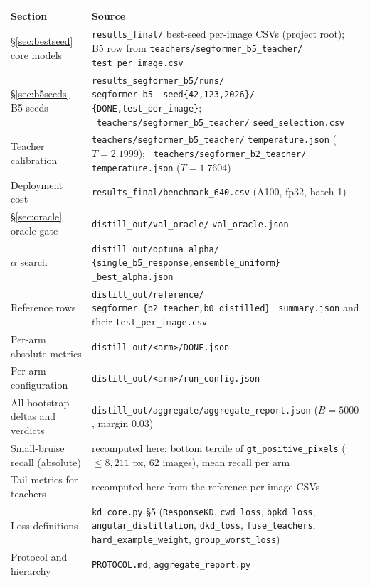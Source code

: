 \documentclass[11pt]{article}
\begin{document}
\begin{center}\footnotesize
\setlength{\tabcolsep}{4pt}
\begin{tabular}{>{\raggedright\arraybackslash}p{3.9cm} >{\raggedright\arraybackslash}p{10.6cm}}
\toprule
\textbf{Section} & \textbf{Source} \\
\midrule
\S\ref{sec:bestseed} core models &
\texttt{results\_final/}\allowbreak{} best-seed per-image CSVs (project root); B5 row from
\texttt{teachers/}\allowbreak\texttt{segformer\_b5\_teacher/}\allowbreak%
\texttt{test\_per\_image.csv} \\
\S\ref{sec:b5seeds} B5 seeds &
\texttt{results\_segformer\_b5/}\allowbreak\texttt{runs/}\allowbreak%
\texttt{segformer\_b5\_\_seed\{42,123,2026\}/}\allowbreak%
\texttt{\{DONE,\allowbreak{}test\_per\_image\}}; \
\texttt{teachers/}\allowbreak\texttt{segformer\_b5\_teacher/}\allowbreak%
\texttt{seed\_selection.csv} \\
Teacher calibration &
\texttt{teachers/}\allowbreak\texttt{segformer\_b5\_teacher/}\allowbreak%
\texttt{temperature.json} ($T{=}2.1999$); \
\texttt{teachers/}\allowbreak\texttt{segformer\_b2\_teacher/}\allowbreak%
\texttt{temperature.json} ($T{=}1.7604$) \\
Deployment cost & \texttt{results\_final/}\allowbreak\texttt{benchmark\_640.csv}
(A100, fp32, batch 1) \\
\S\ref{sec:oracle} oracle gate & \texttt{distill\_out/}\allowbreak\texttt{val\_oracle/}\allowbreak%
\texttt{val\_oracle.json} \\
$\alpha$ search &
\texttt{distill\_out/}\allowbreak\texttt{optuna\_alpha/}\allowbreak%
\texttt{\{single\_b5\_response,}\allowbreak\texttt{ensemble\_uniform\}}\allowbreak%
\texttt{\_best\_alpha.json} \\
Reference rows &
\texttt{distill\_out/}\allowbreak\texttt{reference/}\allowbreak%
\texttt{segformer\_\{b2\_teacher,}\allowbreak\texttt{b0\_distilled\}}\allowbreak%
\texttt{\_summary.json} and their \texttt{test\_per\_image.csv} \\
Per-arm absolute metrics & \texttt{distill\_out/<arm>/DONE.json} \\
Per-arm configuration & \texttt{distill\_out/<arm>/run\_config.json} \\
All bootstrap deltas and verdicts & \texttt{distill\_out/aggregate/aggregate\_report.json}
($B{=}5000$, margin $0.03$) \\
Small-bruise recall (absolute) & recomputed here: bottom tercile of
\texttt{gt\_positive\_pixels} ($\le 8{,}211$ px, 62 images), mean recall per arm \\
Tail metrics for teachers & recomputed here from the reference per-image CSVs \\
Loss definitions & \texttt{kd\_core.py} \S5 (\texttt{ResponseKD}, \texttt{cwd\_loss},
\texttt{bpkd\_loss}, \texttt{angular\_distillation}, \texttt{dkd\_loss},
\texttt{fuse\_teachers}, \texttt{hard\_example\_weight}, \texttt{group\_worst\_loss}) \\
Protocol and hierarchy & \texttt{PROTOCOL.md}, \texttt{aggregate\_report.py} \\
\bottomrule
\end{tabular}
\end{center}
\end{document}
